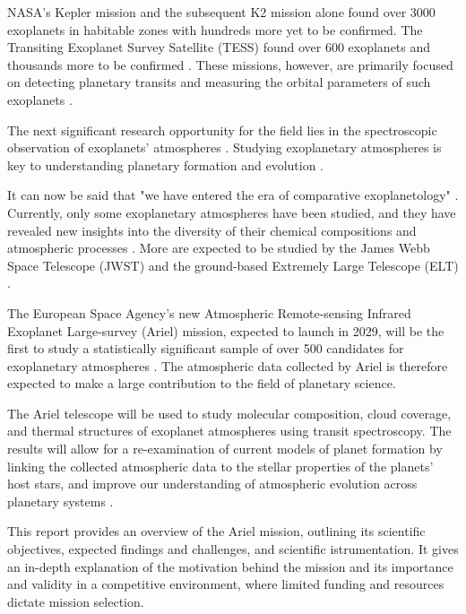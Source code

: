 \documentclass[12pt]{article}
\begin{document}
NASA's Kepler mission and the subsequent K2 mission alone found over 3000 exoplanets in habitable zones with hundreds more yet to be confirmed. The Transiting Exoplanet Survey Satellite (TESS)
found over 600 exoplanets and thousands more to be confirmed \cite{exoplanet_and_candidate_statitics_2025}. These missions, however, are primarily focused on detecting planetary transits and measuring the orbital parameters of such exoplanets \cite{zingales2018ariel}.

The next significant research opportunity for the field lies in the spectroscopic observation of exoplanets' atmospheres \cite{madhusudhan2019exoplanetary}.
Studying exoplanetary atmospheres is key to understanding planetary formation and evolution \cite{zingales2018ariel}.

It can now be said that "we have entered the era of comparative exoplanetology" \cite[p.617]{madhusudhan2019exoplanetary}.
Currently, only some exoplanetary atmospheres have been studied, and they have revealed new insights into the diversity of their chemical compositions and atmospheric processes \cite{madhusudhan2019exoplanetary}.
More are expected to be studied by the James Webb Space Telescope (JWST) and the ground-based Extremely Large Telescope (ELT) \cite{beichman2014observations}.

The European Space Agency's new Atmospheric Remote-sensing Infrared Exoplanet Large-survey (Ariel) mission, expected to launch in 2029, will be the first to study a statistically significant sample of over
500 candidates for exoplanetary atmospheres \cite{zingales2018ariel}.
The atmospheric data collected by Ariel is therefore expected to make a large contribution to the field of planetary science.

The Ariel telescope will be used to study molecular composition, cloud coverage, and thermal structures of exoplanet atmospheres using transit spectroscopy. The results will allow for a re-examination of 
current models of planet formation by linking the collected atmospheric data to the stellar properties of the planets' host stars, and improve our understanding of atmospheric evolution across planetary systems \cite{edwards2019updated}.

This report provides an overview of the Ariel mission, outlining its scientific objectives, expected findings and challenges, and scientific istrumentation. It gives an in-depth explanation of the motivation behind the mission and its importance and validity
in a competitive environment, where limited funding and resources dictate mission selection.
\end{document}
